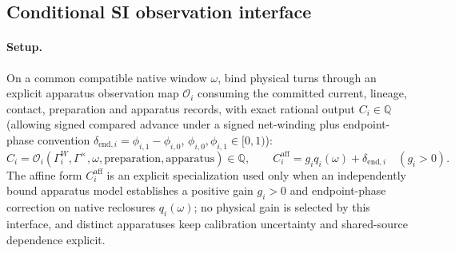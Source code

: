 \subsection{Conditional SI observation interface}
\label{subsec:m3-conditional-si-interface}
\paragraph{Setup.}
On a common compatible native window \(\omega\), bind physical turns through
an explicit apparatus observation map \(\mathcal O_i\) consuming the committed
current, lineage, contact, preparation and apparatus records, with exact
rational output \(C_i\in\mathbb Q\) (allowing signed compared advance under a
signed net-winding plus endpoint-phase convention
\(\delta_{\mathrm{end},i}=\phi_{i,1}-\phi_{i,0}\), \(\phi_{i,0},\phi_{i,1}\in[0,1)\)):
\begin{equation}
 C_i=\mathcal O_i(\Gamma^W_i,\Gamma^\times,\omega,\mathrm{preparation},\mathrm{apparatus})\in\mathbb Q,
 \qquad
 C_i^{\mathrm{aff}}=g_i q_i(\omega)+\delta_{\mathrm{end},i}\quad (g_i>0).
 \label{eq:m3-observation-map}
\end{equation}
The affine form \(C_i^{\mathrm{aff}}\) is an explicit specialization used only
when an independently bound apparatus model establishes a positive gain \(g_i>0\)
and endpoint-phase correction on native reclosures \(q_i(\omega)\); no physical
gain is selected by this interface, and distinct apparatuses keep calibration
uncertainty and shared-source dependence explicit.

